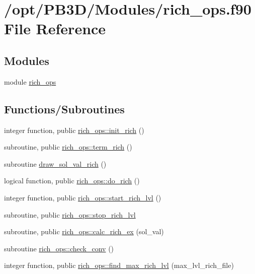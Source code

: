 \hypertarget{rich__ops_8f90}{}\section{/opt/\+P\+B3\+D/\+Modules/rich\+\_\+ops.f90 File Reference}
\label{rich__ops_8f90}
\subsection*{Modules}
\begin{DoxyCompactItemize}
\item 
module \hyperlink{namespacerich__ops}{rich\+\_\+ops}
\end{DoxyCompactItemize}
\subsection*{Functions/\+Subroutines}
\begin{DoxyCompactItemize}
\item 
integer function, public \hyperlink{namespacerich__ops_a9fbbda93eab8973d33063e277c489e7b}{rich\+\_\+ops\+::init\+\_\+rich} ()
\item 
subroutine, public \hyperlink{namespacerich__ops_a3cf72a3ed0806ac9ddff262a00b2e33d}{rich\+\_\+ops\+::term\+\_\+rich} ()
\item 
subroutine \hyperlink{rich__ops_8f90_ac79849bfcf0a924774e4c4b601fc19d8}{draw\+\_\+sol\+\_\+val\+\_\+rich} ()
\item 
logical function, public \hyperlink{namespacerich__ops_a50f4088b9ddd59597987fb4112f2a73e}{rich\+\_\+ops\+::do\+\_\+rich} ()
\item 
integer function, public \hyperlink{namespacerich__ops_a97206a15127960366fcb41d6889cb3b5}{rich\+\_\+ops\+::start\+\_\+rich\+\_\+lvl} ()
\item 
subroutine, public \hyperlink{namespacerich__ops_a56eae87ecc82010895d63b45a16e6106}{rich\+\_\+ops\+::stop\+\_\+rich\+\_\+lvl}
\item 
subroutine, public \hyperlink{namespacerich__ops_ad2717df0206a397d0d7845a96aa5da23}{rich\+\_\+ops\+::calc\+\_\+rich\+\_\+ex} (sol\+\_\+val)
\item 
subroutine \hyperlink{namespacerich__ops_ac00cce686d45540b238b3b6e39c9bdeb}{rich\+\_\+ops\+::check\+\_\+conv} ()
\item 
integer function, public \hyperlink{namespacerich__ops_acadb2170408937a71a230e655bd15675}{rich\+\_\+ops\+::find\+\_\+max\+\_\+rich\+\_\+lvl} (max\+\_\+lvl\+\_\+rich\+\_\+file)
\end{DoxyCompactItemize}


